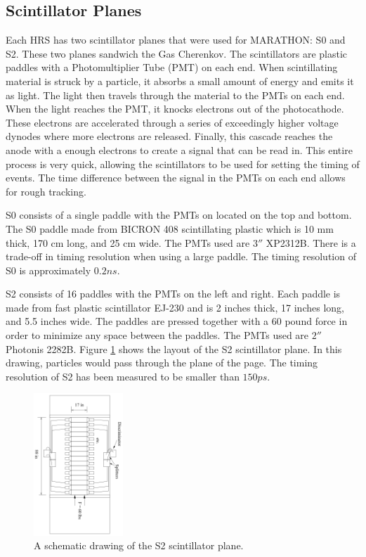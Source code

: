 \subsection{Scintillator Planes}

Each HRS has two scintillator planes that were used for MARATHON: S0 and S2. These two planes sandwich the Gas Cherenkov. The scintillators are plastic paddles with a Photomultiplier Tube (PMT) on each end. When scintillating material is struck by a particle, it absorbs a small amount of energy and emits it as light. The light then travels through the material to the PMTs on each end. When the light reaches the PMT, it knocks electrons out of the photocathode. These electrons are accelerated through a series of exceedingly higher voltage dynodes where more electrons are released. Finally, this cascade reaches the anode with a enough electrons to create a signal that can be read in. This entire process is very quick, allowing the scintillators to be used for setting the timing of events. The time difference between the signal in the PMTs on each end allows for rough tracking.

S0 consists of a single paddle with the PMTs on located on the top and bottom. The S0 paddle made from BICRON 408 scintillating plastic which is 10 mm thick, 170 cm long, and 25 cm wide. The PMTs used are $3''$ XP2312B. There is a trade-off in timing resolution when using a large paddle. The timing resolution of S0 is approximately $0.2ns$.

S2 consists of 16 paddles with the PMTs on the left and right. Each paddle is made from fast plastic scintillator EJ-230 and is 2 inches thick, 17 inches long, and 5.5 inches wide. The paddles are pressed together with a 60 pound force in order to minimize any space between the paddles. The PMTs used are $2''$ Photonis 2282B. Figure \ref{fig:s2} shows the layout of the S2 scintillator plane. In this drawing, particles would pass through the plane of the page. The timing resolution of S2 has been measured to be smaller than $150ps$.

\begin{figure}
\begin{center}
	\includegraphics[width=0.3\textwidth]{./setup/fig/s2.png}
	\caption{A schematic drawing of the S2 scintillator plane.\cite{HASEM}}
	\label{fig:s2}
\end{center}
\end{figure}

